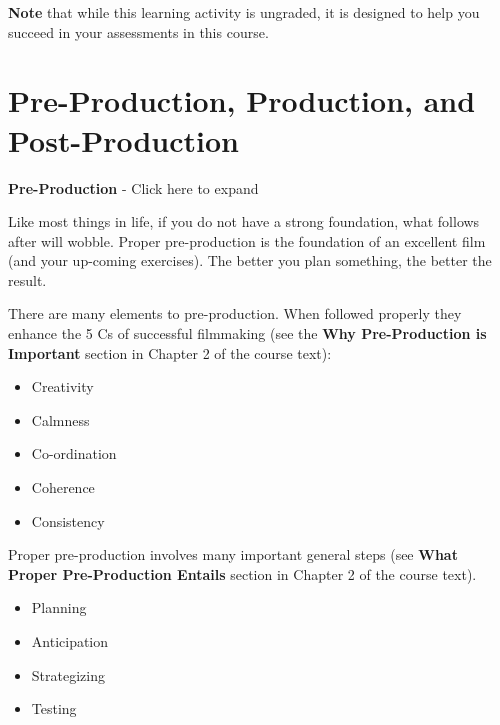 \documentclass[
]{book}
\providecommand{\tightlist}{%
  \setlength{\itemsep}{0pt}\setlength{\parskip}{0pt}}
\begin{document}
\begin{caution}
\textbf{Note} that while this learning activity is ungraded, it is designed to help you succeed in your assessments in this course.
\end{caution}

\hypertarget{pre-production-production-and-post-production}{%
\section{Pre-Production, Production, and Post-Production}\label{pre-production-production-and-post-production}}

\textbf{Pre-Production} - Click here to expand

Like most things in life, if you do not have a strong foundation, what follows after will wobble. Proper pre-production is the foundation of an excellent film (and your up-coming exercises). The better you plan something, the better the result.

There are many elements to pre-production. When followed properly they enhance the 5 Cs of successful filmmaking (see the \textbf{Why Pre-Production is Important} section in Chapter 2 of the course text):

\begin{itemize}
\tightlist
\item
  Creativity\\
\item
  Calmness\\
\item
  Co-ordination\\
\item
  Coherence\\
\item
  Consistency
\end{itemize}

Proper pre-production involves many important general steps (see \textbf{What Proper Pre-Production Entails} section in Chapter 2 of the course text).

\begin{itemize}
\tightlist
\item
  Planning\\
\item
  Anticipation\\
\item
  Strategizing\\
\item
  Testing
\end{itemize}
\end{document}
